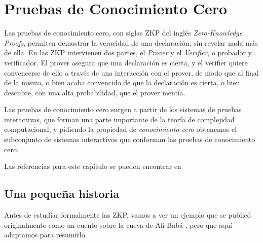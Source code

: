 \chapter{Pruebas de Conocimiento Cero}\label{ch:zkp} 

% 


%	



Las pruebas de conocimiento cero, con siglas ZKP del inglés \textit{Zero-Knowledge Proofs}, permiten demostrar la veracidad de una declaración, sin revelar nada más de ella. En las ZKP intervienen dos partes, el \textit{Prover} y el \textit{Verifier}, o probador y verificador. El prover asegura que una declaración es cierta, y el verifier quiere convencerse de ello a través de una interacción con el prover, de modo que al final de la misma, o bien acaba convencido de que la declaración es cierta, o bien descubre, con una alta probabilidad, que el prover mentía.

Las pruebas de conocimiento cero surgen a partir de los sistemas de pruebas interactivas, que forman una parte importante de la teoría de complejidad computacional, y pidiendo la propiedad de \textit{conocimiento cero} obtenemos el subconjunto de sistemas interactivos que conforman las pruebas de conocimiento cero.

Las referencias para este capítulo se pueden encontrar en %


\section{Una pequeña historia}

Antes de estudiar formalmente las ZKP, vamos a ver un ejemplo que se publicó originalmente como un cuento sobre la cueva de Alí Babá \citep{ZKPcave:story}, pero que aquí adaptamos para resumirlo.

